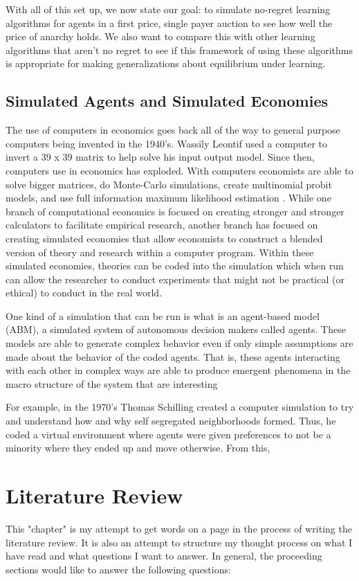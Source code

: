 \documentclass[12pt,twoside]{reedthesis}
\begin{document}
With all of this set up, we now state our goal: to simulate no-regret learning algorithms for agents in a first price, single payer auction to see how well the price of anarchy holds. We also want to compare this with other learning algorithms that aren't no regret to see if this framework of using these algorithms is appropriate for making generalizations about equilibrium under learning.

	
\section{Simulated Agents and Simulated Economies}
The use of computers in economics goes back all of the way to general purpose computers being invented in the 1940's. Wassily Leontif used a computer to invert a 39 x 39 matrix to help solve his input output model. Since then, computers use in economics has exploded. With computers economists are able to solve bigger matrices, do Monte-Carlo simulations, create multinomial probit models, and use full information maximum likelihood estimation \cite{Backhouse2016}. While one branch of computational economics is focused on creating stronger and stronger calculators to facilitate empirical research, another branch has focused on creating simulated economies that allow economists to construct a blended version of theory and research within a computer program. Within these simulated economies, theories can be coded into the simulation which when run can allow the researcher to conduct experiments that might not be practical (or ethical) to conduct in the real world. 

One kind of a simulation that can be run is what is an agent-based model (ABM), a simulated system of autonomous decision makers called agents. These models are able to generate complex behavior even if only simple assumptions are made about the behavior of the coded agents. That is, these agents interacting with each other in complex ways are able to produce emergent phenomena in the macro structure of the system that are interesting

For example, in the 1970's Thomas Schilling created a computer simulation to try and understand how and why self segregated neighborhoods formed. Thus, he coded a virtual environment where agents were given preferences to not be a minority where they ended up and move otherwise. From this,  

 
\chapter{Literature Review}
	This "chapter" is my attempt to get words on a page in the process of writing the literature review. It is also an attempt to structure my thought process on what I have read and what questions I want to answer. In general, the proceeding sections would like to answer the following questions:
	
\end{document}
